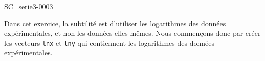 \begin{corrige}{SC_serie3-0003}

Dans cet exercice, la subtilité est d'utiliser les logarithmes des données expérimentales, et non les données elles-mêmes. Nous commençons donc par créer les vecteurs \verb+lnx+ et \verb+lny+ qui contiennent les logarithmes des données expérimentales.


\end{corrige}
